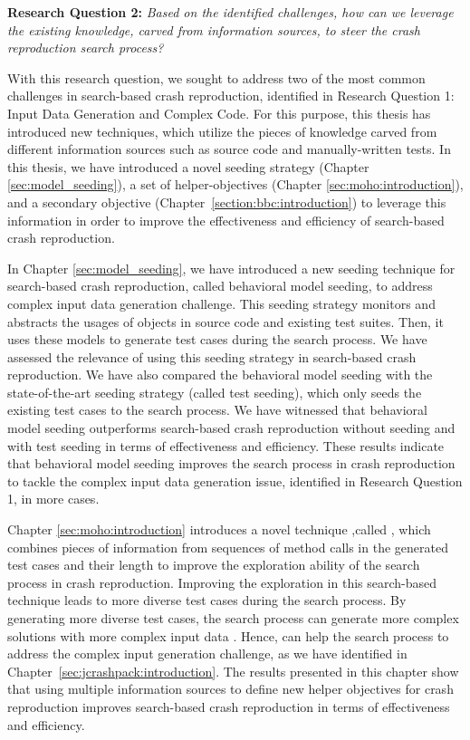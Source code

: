 \textbf{Research Question 2: }\textit{Based on the identified challenges, how can we leverage the existing knowl\-edge, carved from information sources, to steer the crash reproduction search process?}


With this research question, we sought to address two of the most common challenges in search-based crash reproduction, identified in Research Question 1: Input Data Generation and Complex Code. For this purpose, this thesis has introduced new techniques, which utilize the pieces of knowledge carved from different information sources such as source code and manually-written tests. In this thesis, we have introduced a novel seeding strategy (Chapter \ref{sec:model_seeding}), a set of helper-objectives (Chapter \ref{sec:moho:introduction}), and a secondary objective (Chapter~\ref{section:bbc:introduction}) to leverage this information in order to improve the effectiveness and efficiency of search-based crash reproduction.

In Chapter \ref{sec:model_seeding}, we have introduced a new seeding technique for search-based crash reproduction, called behavioral model seeding, to address complex input data generation challenge. This seeding strategy monitors and abstracts the usages of objects in source code and existing test suites. Then, it uses these models to generate test cases during the search process.
We have assessed the relevance of using this seeding strategy in search-based crash reproduction. We have also compared the behavioral model seeding with the state-of-the-art seeding strategy (called test seeding), which only seeds the existing test cases to the search process. We have witnessed that behavioral model seeding outperforms search-based crash reproduction without seeding and with test seeding in terms of effectiveness and efficiency. These results indicate that behavioral model seeding improves the search process in crash reproduction to tackle the complex input data generation issue, identified in Research Question 1, in more cases.

Chapter \ref{sec:moho:introduction} introduces a novel technique ,called \moho, which combines pieces of information from sequences of method calls in the generated test cases and their length to improve the exploration ability of the search process in crash reproduction. Improving the exploration in this search-based technique leads to more diverse test cases during the search process. By generating more diverse test cases, the search process can generate more complex solutions with more complex input data \cite{jensen2004helper}. Hence, \moho can help the search process to address the complex input generation challenge, as we have identified in Chapter~\ref{sec:jcrashpack:introduction}. The results presented in this chapter show that using multiple information sources to define new helper objectives for crash reproduction improves search-based crash reproduction in terms of effectiveness and efficiency.

